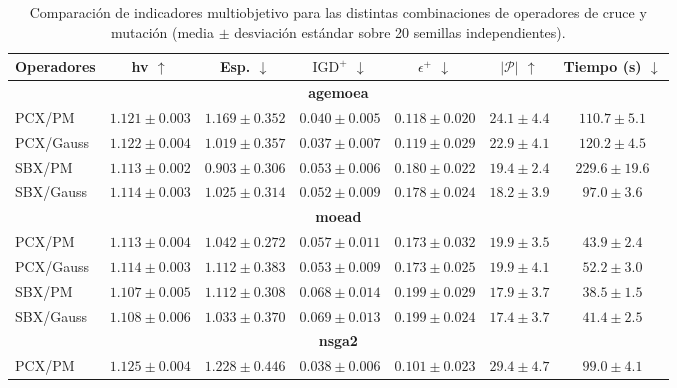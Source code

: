 \begin{table}[!htbp]
\centering
\caption{Comparación de indicadores multiobjetivo para las distintas combinaciones de operadores de cruce y mutación (media $\pm$ desviación estándar sobre 20 semillas independientes).}
\label{tab:comparison_multiobjective_operadores}%
\label{tab:comparison_multiobjective_agemoea}%
\label{tab:comparison_multiobjective_moead}%
\label{tab:comparison_multiobjective_nsga2}%
\label{tab:comparison_multiobjective_nsga3}
\begin{tabular}{lcccccc}
\toprule
Operadores & \acrshort{hv} $\uparrow$ & Esp. $\downarrow$ & $\text{IGD}^+$ $\downarrow$ & $\epsilon^+$ $\downarrow$ & $|\mathcal{P}|$ $\uparrow$ & Tiempo (s) $\downarrow$ \\
\midrule
\multicolumn{7}{c}{\textbf{\acrshort{agemoea}}} \\
\cmidrule(lr){1-7}
PCX/PM & $1.121 \pm 0.003$ & $1.169 \pm 0.352$ & $0.040 \pm 0.005$ & $\mathbf{0.118 \pm 0.020}$ & $\mathbf{24.1 \pm 4.4}$ & $110.7 \pm 5.1$ \\
PCX/Gauss & $\mathbf{1.122 \pm 0.004}$ & $1.019 \pm 0.357$ & $\mathbf{0.037 \pm 0.007}$ & $0.119 \pm 0.029$ & $22.9 \pm 4.1$ & $120.2 \pm 4.5$ \\
SBX/PM & $1.113 \pm 0.002$ & $\mathbf{0.903 \pm 0.306}$ & $0.053 \pm 0.006$ & $0.180 \pm 0.022$ & $19.4 \pm 2.4$ & $229.6 \pm 19.6$ \\
SBX/Gauss & $1.114 \pm 0.003$ & $1.025 \pm 0.314$ & $0.052 \pm 0.009$ & $0.178 \pm 0.024$ & $18.2 \pm 3.9$ & $\mathbf{97.0 \pm 3.6}$ \\
\midrule
\multicolumn{7}{c}{\textbf{\acrshort{moead}}} \\
\cmidrule(lr){1-7}
PCX/PM & $1.113 \pm 0.004$ & $1.042 \pm 0.272$ & $0.057 \pm 0.011$ & $\mathbf{0.173 \pm 0.032}$ & $19.9 \pm 3.5$ & $43.9 \pm 2.4$ \\
PCX/Gauss & $\mathbf{1.114 \pm 0.003}$ & $1.112 \pm 0.383$ & $\mathbf{0.053 \pm 0.009}$ & $0.173 \pm 0.025$ & $\mathbf{19.9 \pm 4.1}$ & $52.2 \pm 3.0$ \\
SBX/PM & $1.107 \pm 0.005$ & $1.112 \pm 0.308$ & $0.068 \pm 0.014$ & $0.199 \pm 0.029$ & $17.9 \pm 3.7$ & $\mathbf{38.5 \pm 1.5}$ \\
SBX/Gauss & $1.108 \pm 0.006$ & $\mathbf{1.033 \pm 0.370}$ & $0.069 \pm 0.013$ & $0.199 \pm 0.024$ & $17.4 \pm 3.7$ & $41.4 \pm 2.5$ \\
\midrule
\multicolumn{7}{c}{\textbf{\acrshort{nsga2}}} \\
\cmidrule(lr){1-7}
PCX/PM & $1.125 \pm 0.004$ & $1.228 \pm 0.446$ & $0.038 \pm 0.006$ & $0.101 \pm 0.023$ & $\mathbf{29.4 \pm 4.7}$ & $99.0 \pm 4.1$ \\

\end{tabular}
\end{table}
